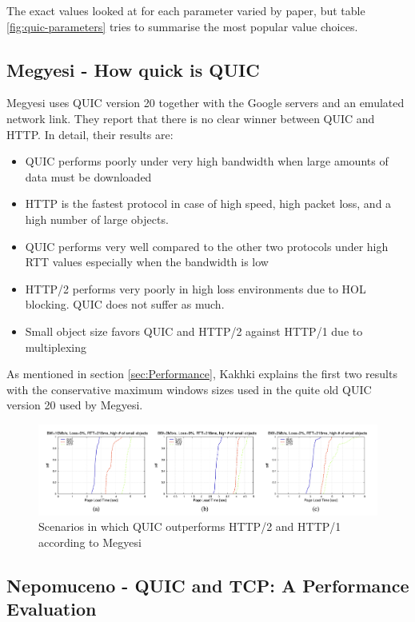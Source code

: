 \documentclass[conference]{IEEEtran}
\begin{document}
The exact values looked at for each parameter varied by paper, but table \ref{fig:quic-parameters} tries to summarise the most popular value choices.


\subsection{Megyesi - How quick is QUIC \cite{HowQuickIsQuic}}

Megyesi uses QUIC version 20 together with the Google servers and an emulated network link. They report that there is no clear winner between QUIC and HTTP. In detail, their results are:

\begin{itemize}
\item QUIC performs poorly under very high bandwidth when large amounts of data must be downloaded
\item HTTP is the fastest protocol in case of high speed, high packet loss, and a high number of large objects.
\item QUIC performs very well compared to the other two protocols under high RTT values especially when the bandwidth is low
\item HTTP/2 performs very poorly in high loss environments due to HOL blocking. QUIC does not suffer as much.
\item Small object size favors QUIC and HTTP/2 against HTTP/1 due to multiplexing
\end{itemize} 

As mentioned in section \ref{sec:Performance}, Kakhki explains the first two results with the conservative maximum windows sizes used in the quite old QUIC version 20 used by Megyesi.

\begin{figure}[htbp]
\centerline{\includegraphics[width=\textwidth]{images/Megyesi QUIC wins.png}}
\caption{Scenarios in which QUIC outperforms HTTP/2 and HTTP/1 according to Megyesi \cite{HowQuickIsQuic}}
\label{fig:megyesi-quic-wins}
\end{figure} 

\subsection{Nepomuceno - QUIC and TCP: A Performance Evaluation}
\end{document}
